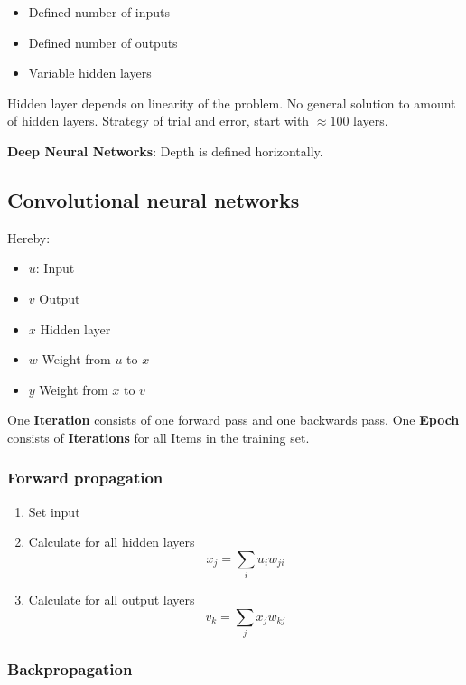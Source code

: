 \documentclass[
    fontsize      = 11pt,
    paper         = a4,
    twoside       = false,
    parskip       = half,
    pagesize      = false,
]{scrartcl}
\providecommand{\tightlist}{%
  \setlength{\itemsep}{0pt}\setlength{\parskip}{0pt}}
\begin{document}
\begin{itemize}
\tightlist
\item
  Defined number of inputs
\item
  Defined number of outputs
\item
  Variable hidden layers
\end{itemize}

Hidden layer depends on linearity of the problem. No general solution to
amount of hidden layers. Strategy of trial and error, start with
\(\approx 100\) layers.

\textbf{Deep Neural Networks}: Depth is defined horizontally.

\hypertarget{convolutional-neural-networks}{%
\subsection{Convolutional neural
networks}\label{convolutional-neural-networks}}

Hereby:

\begin{itemize}
\tightlist
\item
  \(u\): Input
\item
  \(v\) Output
\item
  \(x\) Hidden layer
\item
  \(w\) Weight from \(u\) to \(x\)
\item
  \(y\) Weight from \(x\) to \(v\)
\end{itemize}

One \textbf{Iteration} consists of one forward pass and one backwards
pass. One \textbf{Epoch} consists of \textbf{Iterations} for all Items
in the training set.

\hypertarget{forward-propagation}{%
\subsubsection{Forward propagation}\label{forward-propagation}}

\begin{enumerate}
\def\labelenumi{\arabic{enumi}.}
\tightlist
\item
  Set input
\item
  Calculate for all hidden layers \[x_j = \sum_i u_i w_{ji}\]
\item
  Calculate for all output layers \[v_k = \sum_j x_j w_{kj}\]
\end{enumerate}

\hypertarget{backpropagation}{%
\subsubsection{Backpropagation}\label{backpropagation}}
\end{document}
